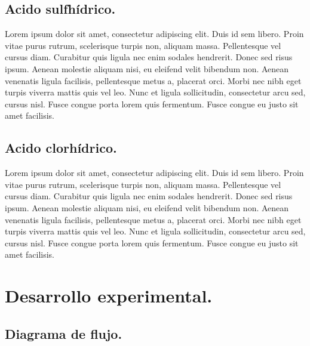\documentclass[letter]{article}
\begin{document}
    \subsection{Acido sulfhídrico.}
        Lorem ipsum dolor sit amet, consectetur adipiscing elit. Duis id sem libero. Proin vitae purus rutrum, scelerisque turpis non, aliquam massa. Pellentesque vel cursus diam. Curabitur quis ligula nec enim sodales hendrerit. Donec sed risus ipsum. Aenean molestie aliquam nisi, eu eleifend velit bibendum non. Aenean venenatis ligula facilisis, pellentesque metus a, placerat orci. Morbi nec nibh eget turpis viverra mattis quis vel leo. Nunc et ligula sollicitudin, consectetur arcu sed, cursus nisl. Fusce congue porta lorem quis fermentum. Fusce congue eu justo sit amet facilisis.\par
    \subsection{Acido clorhídrico.}
        Lorem ipsum dolor sit amet, consectetur adipiscing elit. Duis id sem libero. Proin vitae purus rutrum, scelerisque turpis non, aliquam massa. Pellentesque vel cursus diam. Curabitur quis ligula nec enim sodales hendrerit. Donec sed risus ipsum. Aenean molestie aliquam nisi, eu eleifend velit bibendum non. Aenean venenatis ligula facilisis, pellentesque metus a, placerat orci. Morbi nec nibh eget turpis viverra mattis quis vel leo. Nunc et ligula sollicitudin, consectetur arcu sed, cursus nisl. Fusce congue porta lorem quis fermentum. Fusce congue eu justo sit amet facilisis.\par
    


\section{Desarrollo experimental.}
\subsection{Diagrama de flujo.}\par
 \begin{center}
\end{center}
\end{document}
